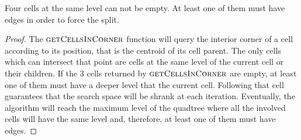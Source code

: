 \begin{lemma}
Four cells at the same level can not be empty.  At least one of them must have edges in order to force the split.
\end{lemma}

\begin{proof}
The $\textsc{getCellsInCorner}$ function will query the interior corner of a cell according to its position, that is the centroid of its cell parent.  The only cells which can intersect that point are cells at the same level of the current cell or their children.  If the 3 cells returned by $\textsc{getCellsInCorner}$ are empty, at least one of them must have a deeper level that the current cell.  Following that cell guarantees that the search space will be shrank at each iteration.  Eventually, the algorithm will reach the maximum level of the quadtree where all the involved cells will have the same level and, therefore, at least one of them must have edges.
\end{proof}
